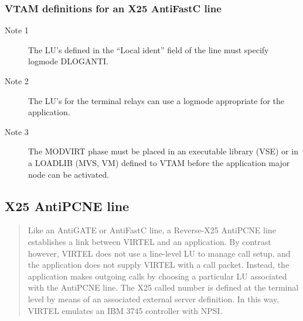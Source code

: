 \documentclass[letterpaper,10pt,english]{sphinxmanual}
\begin{document}
\begin{sphinxVerbatim}[commandchars=\\\{\}]
  
  
  
  
\end{sphinxVerbatim}


\subsubsection{VTAM definitions for an X25 AntiFastC line}
\label{\detokenize{connectivity_guide:vtam-definitions-for-an-x25-antifastc-line}}\begin{description}
\item[{Note 1}] \leavevmode
The LU’s defined in the “Local ident” field of the line must specify logmode DLOGANTI.

\item[{Note 2}] \leavevmode
The LU’s for the terminal relays can use a logmode appropriate for the application.

\item[{Note 3}] \leavevmode
The MODVIRT phase must be placed in an executable library (VSE) or in a LOADLIB (MVS, VM) defined to VTAM before the application major node can be activated.

\end{description}


\subsection{X25 AntiPCNE line}
\label{\detokenize{connectivity_guide:x25-antipcne-line}}\begin{quote}

Like an AntiGATE or AntiFastC line, a Reverse-X25 AntiPCNE line establishes a link between VIRTEL and an application. By contrast however, VIRTEL does not use a line-level LU to manage call setup, and the application does not supply VIRTEL with a call packet. Instead, the application makes outgoing calls by choosing a particular LU associated with the AntiPCNE line. The X25 called number is defined at the terminal level by means of an associated external server definition. In this way, VIRTEL emulates an IBM 3745 controller with NPSI.
\end{quote}
\end{document}
